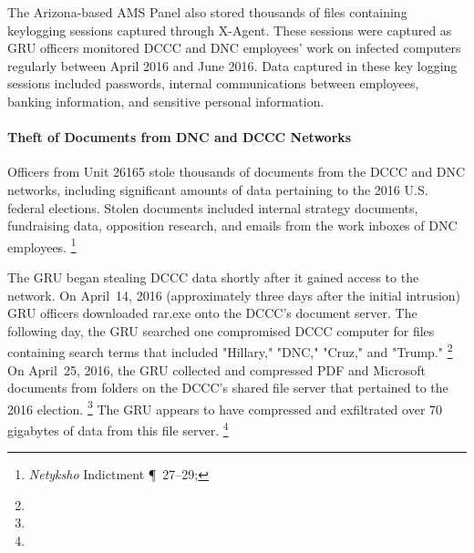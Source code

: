 
The Arizona-based AMS Panel also stored thousands of files containing keylogging sessions captured through X-Agent.
These sessions were captured as GRU officers monitored DCCC and DNC employees' work on infected computers regularly between April 2016 and June 2016.
Data captured in these key logging sessions included passwords, internal communications between employees, banking information, and sensitive personal information.

\paragraph{Theft of Documents from DNC and DCCC Networks}

Officers from Unit 26165 stole thousands of documents from the DCCC and DNC networks, including significant amounts of data pertaining to the 2016 U.S. federal elections.
Stolen documents included internal strategy documents, fundraising data, opposition research, and emails from the work inboxes of DNC employees.%
\footnote{\textit{Netyksho} Indictment \P~27--29; }

The GRU began stealing DCCC data shortly after it gained access to the network.
On April~14, 2016 (approximately three days after the initial intrusion) GRU officers downloaded rar.exe onto the DCCC's document server.
The following day, the GRU searched one compromised DCCC computer for files containing search terms that included "Hillary," "DNC," "Cruz," and "Trump."%
\footnote{}
On April~25, 2016, the GRU collected and compressed PDF and Microsoft documents from folders on the DCCC's shared file server that pertained to the 2016 election.%
\footnote{}
The GRU appears to have compressed and exfiltrated over 70 gigabytes of data from this file server.%
\footnote{}

